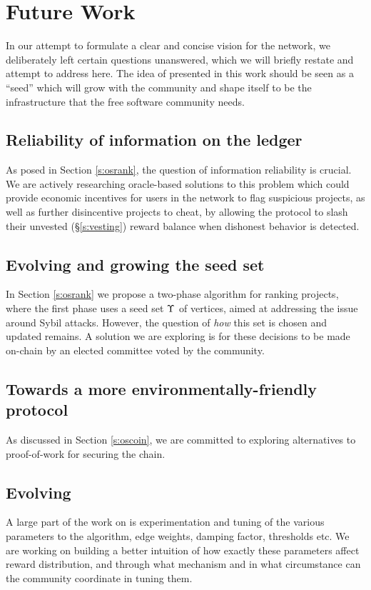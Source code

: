 \section{Future Work}
\label{s:future-work}

In our attempt to formulate a clear and concise vision for the \oscoin{}
network, we deliberately left certain questions unanswered, which we will
briefly restate and attempt to address here. The idea of \oscoin{} presented in
this work should be seen as a ``seed'' which will grow with the community and
shape itself to be the infrastructure that the free software community needs.

\subsection{Reliability of information on the ledger}
As posed in Section \ref{s:osrank}, the question of information
reliability is crucial.  We are actively researching oracle-based solutions to
this problem which could provide economic incentives for users in the network
to flag suspicious projects, as well as further disincentive projects to cheat,
by allowing the protocol to slash their unvested (\S\ref{s:vesting}) reward
balance when dishonest behavior is detected.

\subsection{Evolving and growing the seed set}
In Section \ref{s:osrank} we propose a two-phase \osrank{} algorithm for
ranking projects, where the first phase uses a seed set $\Upsilon$ of vertices,
aimed at addressing the issue around Sybil attacks.  However, the question of
\emph{how} this set is chosen and updated remains. A solution we are exploring
is for these decisions to be made on-chain by an elected committee voted by
the community.

\subsection{Towards a more environmentally-friendly protocol}
As discussed in Section \ref{s:oscoin}, we are committed to exploring
alternatives to proof-of-work for securing the chain.

\subsection{Evolving \osrank{}}
A large part of the work on \osrank{} is experimentation and tuning of the
various parameters to the algorithm, \eg edge weights, damping factor, thresholds
etc. We are working on building a better intuition of how exactly these parameters
affect reward distribution, and through what mechanism and in what circumstance
can the community coordinate in tuning them.
